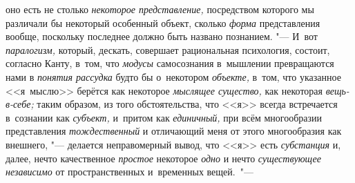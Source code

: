 оно есть не столько {\em некоторое
представление,} посредством которого мы различали бы
некоторый особенный объект, сколько {\em форма} представления
вообще, поскольку последнее должно быть названо познанием. "--- И~вот
{\em паралогизм,} который, дескать, совершает рациональная психология,
состоит, согласно Канту, в~том, что {\em модусы}
самосознания в~мышлении превращаются нами в {\em понятия рассудка}
будто бы о~некотором {\em объекте,} в~том, что
указанное <<я~мыслю>> берётся как некоторое {\em мыслящее существо,}
как некоторая {\em вещь-в-себе;} таким
образом, из того обстоятельства, что <<я>> всегда встречается в~сознании
как {\em субъект,} и~притом как {\em единичный,} при всём
многообразии представления {\em тождественный} и
отличающий меня от этого многообразия как внешнего, "---
делается неправомерный вывод, что <<я>> есть {\em субстанция} и,
далее, нечто качественное {\em простое} некоторое {\em одно}
и нечто {\em существующее независимо} от пространственных и~временных
вещей.~"---

